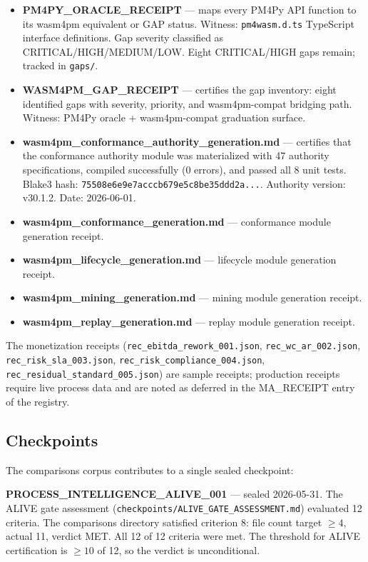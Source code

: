 \begin{itemize}
  \item \textbf{PM4PY\_ORACLE\_RECEIPT} --- maps every PM4Py API function to its
    wasm4pm equivalent or GAP status. Witness: \texttt{pm4wasm.d.ts} TypeScript
    interface definitions. Gap severity classified as CRITICAL/HIGH/MEDIUM/LOW.
    Eight CRITICAL/HIGH gaps remain; tracked in \texttt{gaps/}.
  \item \textbf{WASM4PM\_GAP\_RECEIPT} --- certifies the gap inventory: eight
    identified gaps with severity, priority, and wasm4pm-compat bridging path.
    Witness: PM4Py oracle + wasm4pm-compat graduation surface.
  \item \textbf{wasm4pm\_conformance\_authority\_generation.md} --- certifies that
    the conformance authority module was materialized with 47 authority
    specifications, compiled successfully (0 errors), and passed all 8 unit tests.
    Blake3 hash: \texttt{75508e6e9e7acccb679e5c8be35ddd2a...}.
    Authority version: v30.1.2. Date: 2026-06-01.
  \item \textbf{wasm4pm\_conformance\_generation.md} --- conformance module
    generation receipt.
  \item \textbf{wasm4pm\_lifecycle\_generation.md} --- lifecycle module generation
    receipt.
  \item \textbf{wasm4pm\_mining\_generation.md} --- mining module generation
    receipt.
  \item \textbf{wasm4pm\_replay\_generation.md} --- replay module generation
    receipt.
\end{itemize}

The monetization receipts (\texttt{rec\_ebitda\_rework\_001.json},
\texttt{rec\_wc\_ar\_002.json}, \texttt{rec\_risk\_sla\_003.json},
\texttt{rec\_risk\_compliance\_004.json}, \texttt{rec\_residual\_standard\_005.json})
are sample receipts; production receipts require live process data and are noted
as deferred in the MA\_RECEIPT entry of the registry.

\subsection{Checkpoints}
\label{sec:comparisons-evidence-checkpoints}

The comparisons corpus contributes to a single sealed checkpoint:

\textbf{PROCESS\_INTELLIGENCE\_ALIVE\_001} --- sealed 2026-05-31. The ALIVE gate
assessment (\texttt{checkpoints/ALIVE\_GATE\_ASSESSMENT.md}) evaluated 12 criteria.
The comparisons directory satisfied criterion 8: file count target $\geq 4$,
actual 11, verdict MET. All 12 of 12 criteria were met. The threshold for ALIVE
certification is $\geq 10$ of 12, so the verdict is unconditional.

